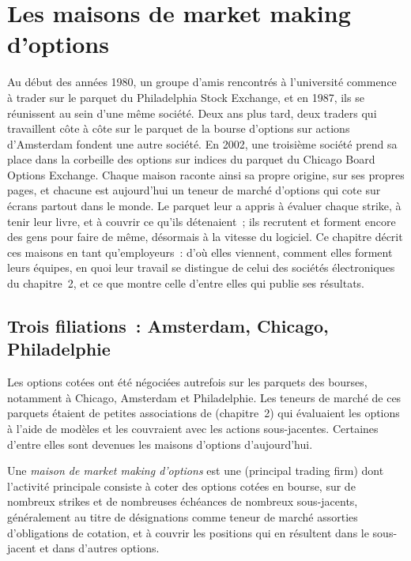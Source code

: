 \chapter{Les maisons de market making d'options}\label{ch:in:the-options-market-making-houses}

Au début des années 1980, un groupe d'amis rencontrés à l'université commence à trader sur le parquet du Philadelphia Stock Exchange, et
en 1987, ils se réunissent au sein d'une même société. Deux ans plus tard, deux traders qui travaillent côte à côte sur le parquet
de la bourse d'options sur actions d'Amsterdam fondent une autre société. En 2002, une troisième société prend sa place dans la corbeille des options sur indices du parquet du
Chicago Board Options Exchange. Chaque maison raconte ainsi sa propre origine, sur ses propres pages, et chacune est aujourd'hui
un teneur de marché d'options qui cote sur écrans partout dans le monde. Le parquet leur a appris à évaluer chaque strike,
à tenir leur livre, et à couvrir ce qu'ils détenaient~; ils recrutent et forment encore des gens pour faire de même, désormais à la vitesse du
logiciel. Ce chapitre décrit ces maisons en tant qu'employeurs~: d'où elles viennent, comment elles forment leurs équipes, en quoi leur travail
se distingue de celui des sociétés électroniques du chapitre~2, et ce que montre celle d'entre elles qui publie ses résultats.

\section{Trois filiations~: Amsterdam, Chicago, Philadelphie}

Les options cotées ont été négociées autrefois sur les parquets des bourses, notamment à Chicago, Amsterdam et Philadelphie. Les teneurs de marché
de ces parquets étaient de petites associations de  (chapitre~2) qui évaluaient les options à l'aide
de modèles et les couvraient avec les actions sous-jacentes. Certaines d'entre elles sont devenues les maisons d'options d'aujourd'hui.

\begin{definition}\label{def:in:the-options-market-making-houses:house}
Une \emph{maison de market making d'options} est une  (principal trading firm) dont l'activité principale
consiste à coter des options cotées en bourse, sur de nombreux strikes et de nombreuses échéances de nombreux sous-jacents, généralement au titre de
désignations comme teneur de marché assorties d'obligations de cotation, et à couvrir les positions qui en résultent dans le sous-jacent et dans d'autres options.
\end{definition}

